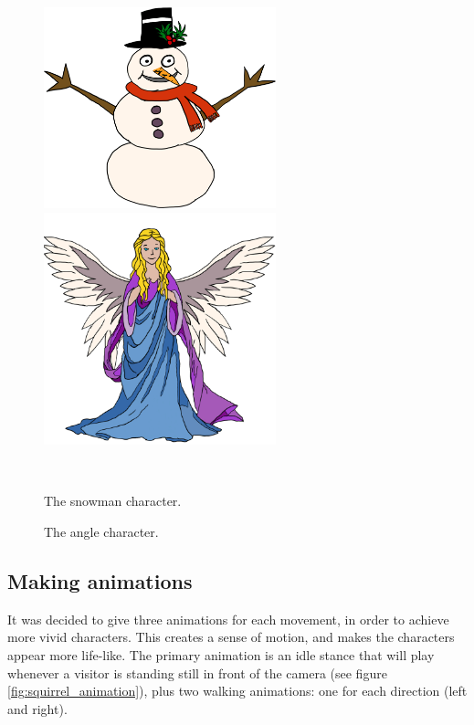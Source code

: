 \begin{figure}[htbp] \centering
\begin{minipage}[b]{0.45\textwidth} \centering
\includegraphics[width=0.60\textwidth]{Pictures/Design/snowman} %
\end{minipage} \hfill
\begin{minipage}[b]{0.45\textwidth} \centering
\includegraphics[width=0.60\textwidth]{Pictures/Design/Angel} %
\end{minipage} \\ %
\begin{minipage}[t]{0.45\textwidth}
\caption{The snowman character.} %
\label{fig:PixieGirl}
\end{minipage} \hfill
\begin{minipage}[t]{0.45\textwidth}
\caption{The angle character.} %
\label{fig:Angel}
\end{minipage}
\end{figure}

\subsection{Making animations}
It was decided to give three animations for each movement, in order to achieve more vivid characters. This creates a sense of motion, and makes the characters appear more life-like. The primary animation is an idle stance that will play whenever a visitor is standing still in front of the camera (see figure \ref{fig:squirrel_animation}), plus two walking animations: one for each direction (left and right).

